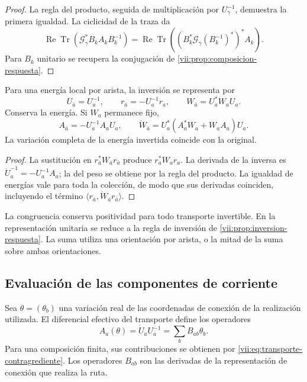 \begin{proof}
La regla del producto, seguida de multiplicación por
\(U_\gamma^{-1}\), demuestra la primera igualdad. La ciclicidad
de la traza da
\[
 \operatorname{Re}\operatorname{Tr}
  (\mathcal G_\gamma^*B_kA_kB_k^{-1})
 =\operatorname{Re}\operatorname{Tr}
  ((B_k^*\mathcal G_\gamma(B_k^{-1})^*)^*A_k).
\]
Para \(B_k\) unitario se recupera la conjugación de
\ref{vii:prop:composicion-respuesta}.
\end{proof}

\begin{proposition}
\label{vii:prop:inversion-congruencia}
Para una energía local por arista, la inversión se representa por
\begin{equation}
 U_{\bar a}=U_a^{-1},\qquad
 r_{\bar a}=-U_a^{-1}r_a,\qquad
 W_{\bar a}=U_a^*W_aU_a.
 \label{vii:eq:inversion-peso-general}
\end{equation}
Conserva la energía. Si \(W_a\) permanece fijo,
\[
 A_{\bar a}=-U_a^{-1}A_aU_a,\qquad
 \dot W_{\bar a}=U_a^*(A_a^*W_a+W_aA_a)U_a.
\]
La variación completa de la energía invertida coincide con la original.
\end{proposition}

\begin{proof}
La sustitución en \(r_{\bar a}^*W_{\bar a}r_{\bar a}\)
produce \(r_a^*W_ar_a\). La derivada de la inversa es
\(\dot U_a^{-1}=-U_a^{-1}A_a\); la del peso se obtiene por
la regla del producto. La igualdad de energías vale para toda la
colección, de modo que sus derivadas coinciden, incluyendo el término
\(\langle r_{\bar a},\dot W_{\bar a}r_{\bar a}\rangle\).
\end{proof}

La congruencia conserva positividad para todo transporte invertible.
En la representación unitaria se reduce a la regla de inversión de
\ref{vii:prop:inversion-respuesta}. La suma utiliza una orientación
por arista, o la mitad de la suma sobre ambas orientaciones.

\subsection{Evaluación de las componentes de corriente}

Sea \(\theta=(\theta_b)\) una variación real de las coordenadas
de conexión de la realización utilizada. El diferencial efectivo del
transporte define los operadores
\begin{equation}
 A_a(\theta)=\dot U_aU_a^{-1}
     =\sum_bB_{ab}\theta_b.
 \label{vii:eq:diferencial-conexion-transporte}
\end{equation}
Para una composición finita, sus contribuciones se obtienen por
\eqref{vii:eq:transporte-contragrediente}. Los operadores
\(B_{ab}\) son las derivadas de la representación de conexión que
realiza la ruta.

